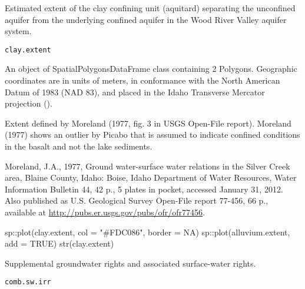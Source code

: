 \documentclass[a4paper]{book}
\begin{document}
%
\begin{Description}\relax
Estimated extent of the clay confining unit (aquitard) separating the
unconfined aquifer from the underlying confined aquifer in the
Wood River Valley aquifer system.
\end{Description}
%
\begin{Usage}
\begin{verbatim}
clay.extent
\end{verbatim}
\end{Usage}
%
\begin{Format}
An object of SpatialPolygonsDataFrame class containing 2 Polygons.
Geographic coordinates are in units of meters, in conformance with the
North American Datum of 1983 (NAD 83), and placed in the
Idaho Transverse Mercator projection ().
\end{Format}
%
\begin{Source}\relax
Extent defined by Moreland (1977, fig. 3 in USGS Open-File report).
Moreland (1977) shows an outlier by Picabo that is assumed to
indicate confined conditions in the basalt and not the lake sediments.
\end{Source}
%
\begin{References}\relax
Moreland, J.A., 1977, Ground water-surface water relations in the Silver Creek area,
Blaine County, Idaho: Boise, Idaho Department of Water Resources, Water Information Bulletin 44,
42 p., 5 plates in pocket, accessed January 31, 2012.
Also published as U.S. Geological Survey Open-File report 77-456, 66 p.,
available at \url{http://pubs.er.usgs.gov/pubs/ofr/ofr77456}.
\end{References}
%
\begin{Examples}
\begin{ExampleCode}
sp::plot(clay.extent, col = "#FDC086", border = NA)
sp::plot(alluvium.extent, add = TRUE)
str(clay.extent)

\end{ExampleCode}
\end{Examples}
%
\begin{Description}\relax
Supplemental groundwater rights and associated surface-water rights.
\end{Description}
%
\begin{Usage}
\begin{verbatim}
comb.sw.irr
\end{verbatim}
\end{Usage}
\end{document}
